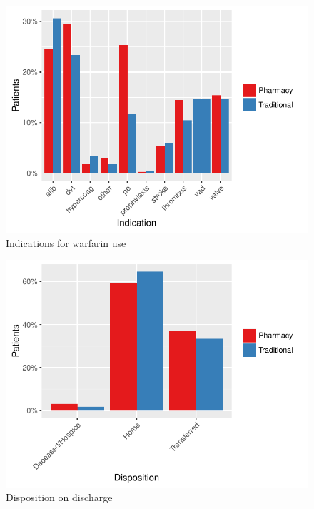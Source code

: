 \documentclass[]{article}
\begin{document}
\begin{figure}[H]
\centering
\includegraphics{warfarin_analysis_ASHP_files/figure-latex/indications-1.pdf}
\caption{Indications for warfarin use}
\end{figure}

\begin{figure}[H]
\centering
\includegraphics{warfarin_analysis_ASHP_files/figure-latex/disposition-1.pdf}
\caption{Disposition on discharge}
\end{figure}
\end{document}
